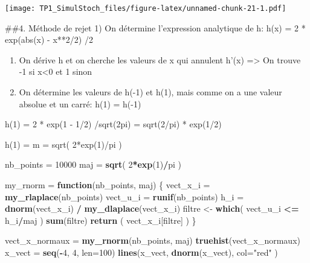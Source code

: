 \documentclass[]{article}
\newenvironment{Shaded}{\begin{snugshade}}{\end{snugshade}}
\newcommand{\ControlFlowTok}[1]{\textcolor[rgb]{0.13,0.29,0.53}{\textbf{#1}}}
\newcommand{\DataTypeTok}[1]{\textcolor[rgb]{0.13,0.29,0.53}{#1}}
\newcommand{\DecValTok}[1]{\textcolor[rgb]{0.00,0.00,0.81}{#1}}
\newcommand{\KeywordTok}[1]{\textcolor[rgb]{0.13,0.29,0.53}{\textbf{#1}}}
\newcommand{\NormalTok}[1]{#1}
\newcommand{\OperatorTok}[1]{\textcolor[rgb]{0.81,0.36,0.00}{\textbf{#1}}}
\newcommand{\StringTok}[1]{\textcolor[rgb]{0.31,0.60,0.02}{#1}}
\begin{document}
\texttt{[image: TP1\_SimulStoch\_files/figure-latex/unnamed-chunk-21-1.pdf]}

\#\#4. Méthode de rejet 1) On détermine l'expression analytique de h:
h(x) = 2 * exp(abs(x) - x**2/2) /2

\begin{enumerate}
\def\labelenumi{\arabic{enumi})}
\setcounter{enumi}{1}
\item
  On dérive h et on cherche les valeurs de x qui annulent h'(x)
  =\textgreater{} On trouve -1 si x\textless{}0 et 1 sinon
\item
  On détermine les valeurs de h(-1) et h(1), mais comme on a une valeur
  absolue et un carré: h(1) = h(-1)
\end{enumerate}

h(1) = 2 * exp(1 - 1/2) /sqrt(2pi) = sqrt(2/pi) * exp(1/2)

h(1) = m = sqrt( 2*exp(1)/pi )

\begin{Shaded}
\begin{Highlighting}[]
\NormalTok{nb_points =}\StringTok{ }\DecValTok{10000}
\NormalTok{maj =}\StringTok{ }\KeywordTok{sqrt}\NormalTok{( }\DecValTok{2}\OperatorTok{*}\KeywordTok{exp}\NormalTok{(}\DecValTok{1}\NormalTok{)}\OperatorTok{/}\NormalTok{pi )}

\NormalTok{my_rnorm =}\StringTok{ }\ControlFlowTok{function}\NormalTok{(nb_points, maj)}
\NormalTok{\{}
\NormalTok{  vect_x_i =}\StringTok{ }\KeywordTok{my_rlaplace}\NormalTok{(nb_points)}
\NormalTok{  vect_u_i =}\StringTok{ }\KeywordTok{runif}\NormalTok{(nb_points)}
\NormalTok{  h_i =}\StringTok{ }\KeywordTok{dnorm}\NormalTok{(vect_x_i) }\OperatorTok{/}\StringTok{ }\KeywordTok{my_dlaplace}\NormalTok{(vect_x_i)}
\NormalTok{  filtre <-}\StringTok{ }\KeywordTok{which}\NormalTok{( vect_u_i }\OperatorTok{<=}\StringTok{ }\NormalTok{h_i}\OperatorTok{/}\NormalTok{maj )}
  \KeywordTok{sum}\NormalTok{(filtre)}
  \KeywordTok{return}\NormalTok{ ( vect_x_i[filtre] )}
\NormalTok{\}}


\NormalTok{vect_x_normaux =}\StringTok{ }\KeywordTok{my_rnorm}\NormalTok{(nb_points, maj)}
\KeywordTok{truehist}\NormalTok{(vect_x_normaux)}
\NormalTok{x_vect =}\StringTok{ }\KeywordTok{seq}\NormalTok{(}\OperatorTok{-}\DecValTok{4}\NormalTok{, }\DecValTok{4}\NormalTok{, }\DataTypeTok{len=}\DecValTok{100}\NormalTok{)}
\KeywordTok{lines}\NormalTok{(x_vect, }\KeywordTok{dnorm}\NormalTok{(x_vect), }\DataTypeTok{col=}\StringTok{"red"}\NormalTok{ )}
\end{Highlighting}
\end{Shaded}
\end{document}
